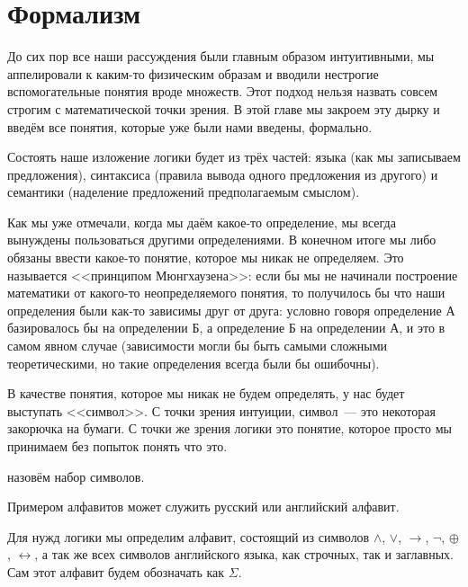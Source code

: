 \section{Формализм}

До сих пор все наши рассуждения были главным образом интуитивными, мы аппелировали к каким-то физическим образам и вводили нестрогие вспомогательные понятия вроде множеств. Этот подход нельзя назвать совсем строгим с математической точки зрения. В этой главе мы закроем эту дырку и введём все понятия, которые уже были нами введены, формально.

Состоять наше изложение логики будет из трёх частей: языка (как мы записываем предложения), синтаксиса (правила вывода одного предложения из другого) и семантики (наделение предложений предполагаемым смыслом).

Как мы уже отмечали, когда мы даём какое-то определение, мы всегда вынуждены пользоваться другими определениями. В конечном итоге мы либо обязаны ввести какое-то понятие, которое мы никак не определяем. Это называется <<принципом Мюнгхаузена>>: если бы мы не начинали построение математики от какого-то неопределяемого понятия, то получилось бы что наши определения были как-то зависимы друг от друга: условно говоря определение А базировалось бы на определении Б, а определение Б на определении А, и это в самом явном случае (зависимости могли бы быть самыми сложными теоретическими, но такие определения всегда были бы ошибочны).

В качестве понятия, которое мы никак не будем определять, у нас будет выступать <<символ>>. С точки зрения интуиции, символ~--- это некоторая закорючка на бумаги. С точки же зрения логики это понятие, которое просто мы принимаем без попыток понять что это.

\begin{definition}
 назовём набор символов.
\end{definition}

\begin{example}
Примером алфавитов может служить русский или английский алфавит.
\end{example}

\begin{example}
Для нужд логики мы определим алфавит, состоящий из символов $\land$, $\lor$, $\to$, $\neg$, $\oplus$, $\leftrightarrow$, а так же всех символов английского языка, как строчных, так и заглавных. Сам этот алфавит будем обозначать как $\Sigma$.
\end{example}

